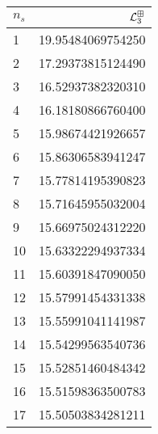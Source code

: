 \begin{tabular}[t]{lr}
\toprule
  $n_{s}$ &  $\mathcal L^{\boxplus}_3$ \\
\midrule
        1 &                   19.95484069754250 \\
        2 &                   17.29373815124490 \\
        3 &                   16.52937382320310 \\
        4 &                   16.18180866760400 \\
        5 &                   15.98674421926657 \\
        6 &                   15.86306583941247 \\
        7 &                   15.77814195390823 \\
        8 &                   15.71645955032004 \\
        9 &                   15.66975024312220 \\
       10 &                   15.63322294937334 \\
       11 &                   15.60391847090050 \\
       12 &                   15.57991454331338 \\
       13 &                   15.55991041141987 \\
       14 &                   15.54299563540736 \\
       15 &                   15.52851460484342 \\
       16 &                   15.51598363500783 \\
       17 &                   15.50503834281211 \\
\bottomrule
\end{tabular}
